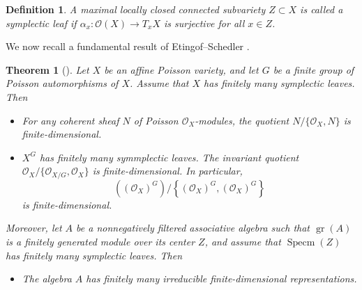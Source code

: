 \documentclass[9pt]{amsart}
\newtheorem{theorem}{Theorem}[section]
\newtheorem{definition}{Definition}[section]
\begin{document}
\begin{definition}
A maximal locally closed connected subvariety $Z \subset X$ is called a \emph{symplectic leaf} if $\alpha_x: \mathcal{O}(X) \rightarrow T_x X$ is surjective for all $x \in Z$.
\end{definition}

We now recall a fundamental result of Etingof–Schedler \cite{etingof2010poisson}.
\begin{theorem}[\cite{etingof2010poisson}]\label{leaves}
Let \( X \) be an affine Poisson variety, and let \( G \) be a finite group of Poisson automorphisms of \( X \). Assume that \( X \) has finitely many symplectic leaves. Then
\begin{itemize}
    \item[(1)] For any coherent sheaf \( N \) of Poisson \( \mathcal{O}_X \)-modules, the quotient \( N / \{ \mathcal{O}_X, N \} \) is finite-dimensional.
    \item[(2)] $X^G$ has finitely many symmplectic leaves. The invariant quotient $\mathcal{O}_X / \{\mathcal{O}_{X/G}, \mathcal{O}_X\}$ is finite-dimensional. In particular, 
    \[
    \left((\mathcal{O}_X)^{G}\right)/\left\{(\mathcal{O}_X)^{G}, (\mathcal{O}_X)^{G}\right\}
    \]
    is finite-dimensional.\end{itemize}
Moreover, let \( A \) be a nonnegatively filtered associative algebra such that \( \operatorname{gr}(A) \) is a finitely generated module over its center \( Z \), and assume that \( \operatorname{Specm}(Z) \) has finitely many symplectic leaves. Then
\begin{itemize}
    \item[(3)] The algebra \( A \) has finitely many irreducible finite-dimensional representations.
\end{itemize}
\end{theorem}
\end{document}

